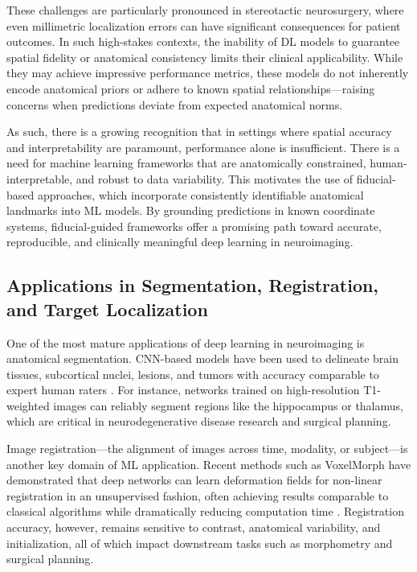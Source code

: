 These challenges are particularly pronounced in stereotactic neurosurgery, where even millimetric localization errors can have significant consequences for patient outcomes. In such high-stakes contexts, the inability of DL models to guarantee spatial fidelity or anatomical consistency limits their clinical applicability. While they may achieve impressive performance metrics, these models do not inherently encode anatomical priors or adhere to known spatial relationships—raising concerns when predictions deviate from expected anatomical norms.

As such, there is a growing recognition that in settings where spatial accuracy and interpretability are paramount, performance alone is insufficient. There is a need for machine learning frameworks that are anatomically constrained, human-interpretable, and robust to data variability. This motivates the use of fiducial-based approaches, which incorporate consistently identifiable anatomical landmarks into ML models. By grounding predictions in known coordinate systems, fiducial-guided frameworks offer a promising path toward accurate, reproducible, and clinically meaningful deep learning in neuroimaging.

\subsection{Applications in Segmentation, Registration, and Target Localization}

One of the most mature applications of deep learning in neuroimaging is anatomical segmentation. CNN-based models have been used to delineate brain tissues, subcortical nuclei, lesions, and tumors with accuracy comparable to expert human raters \cite{dolz2018denseunet}. For instance, networks trained on high-resolution T1-weighted images can reliably segment regions like the hippocampus or thalamus, which are critical in neurodegenerative disease research and surgical planning.

Image registration—the alignment of images across time, modality, or subject—is another key domain of ML application. Recent methods such as VoxelMorph have demonstrated that deep networks can learn deformation fields for non-linear registration in an unsupervised fashion, often achieving results comparable to classical algorithms while dramatically reducing computation time \cite{balakrishnan2019voxelmorph}. Registration accuracy, however, remains sensitive to contrast, anatomical variability, and initialization, all of which impact downstream tasks such as morphometry and surgical planning.

